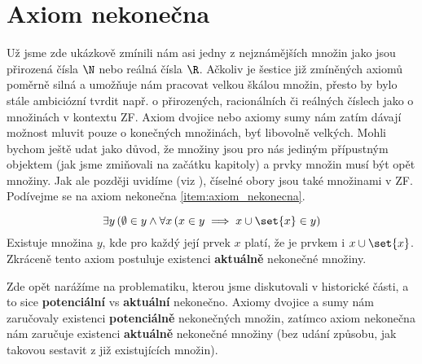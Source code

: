 \section{Axiom nekonečna}\label{sec:axiom_nekonecna}
Už jsme zde ukázkově zmínili nám asi jedny z nejznámějších množin jako jsou přirozená čísla $\N$ nebo reálná čísla $\R$. Ačkoliv je šestice již zmíněných axiomů poměrně silná a umožňuje nám pracovat velkou škálou množin, přesto by bylo stále ambiciózní tvrdit např. o přirozených, racionálních či reálných číslech jako o množinách v kontextu \textsf{ZF}. Axiom dvojice nebo axiomy sumy nám zatím dávají možnost mluvit pouze o konečných množinách, byť libovolně velkých. Mohli bychom ještě udat jako důvod, že množiny jsou pro nás jediným přípustným objektem (jak jsme zmiňovali na začátku kapitoly) a prvky množin musí být opět množiny. Jak ale později uvidíme (viz ), číselné obory jsou také množinami v \textsf{ZF}. Podívejme se na axiom nekonečna \ref{item:axiom_nekonecna}.
\medskip

\begin{equation*}
    \exists y\, (\emptyset\in y \land \forall x\,(x\in y\implies x\cup\set{x}\in y)
\end{equation*}
Existuje množina $y$, kde pro každý její prvek $x$ platí, že je prvkem i $x\cup\set{x}$. Zkráceně tento axiom postuluje existenci \textbf{aktuálně} nekonečné množiny.\par
Zde opět narážíme na problematiku, kterou jsme diskutovali v historické části, a to sice \textbf{potenciální} vs \textbf{aktuální} nekonečno. Axiomy dvojice a sumy nám zaručovaly existenci \textbf{potenciálně} nekonečných množin, zatímco axiom nekonečna nám zaručuje existenci \textbf{aktuálně} nekonečné množiny (bez udání způsobu, jak takovou sestavit z již existujících množin).\par